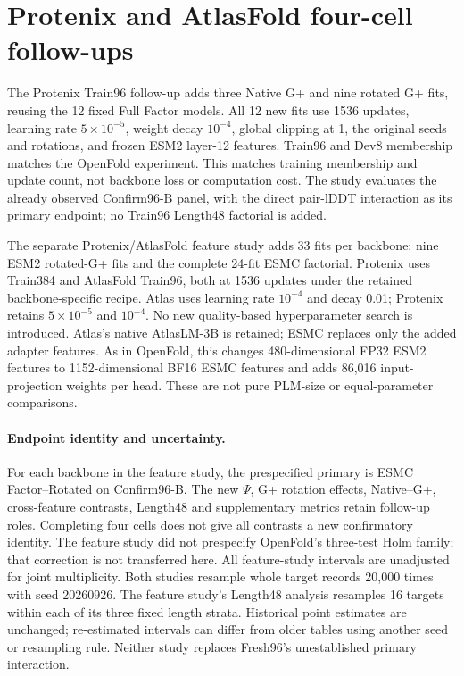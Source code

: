 \section{Protenix and AtlasFold four-cell follow-ups}
\label{app:dh_fourcells}
The Protenix Train96 follow-up adds three Native G+ and nine rotated G+ fits,
reusing the 12 fixed Full Factor models. All 12 new fits use 1536 updates,
learning rate $5\times10^{-5}$, weight decay $10^{-4}$, global clipping at 1,
the original seeds and rotations, and frozen ESM2 layer-12 features.
Train96 and Dev8 membership matches the OpenFold experiment. This matches
training membership and update count, not backbone loss or computation cost.
The study evaluates the already observed Confirm96-B panel, with the direct
pair-lDDT interaction as its primary endpoint; no Train96 Length48 factorial
is added.

The separate Protenix/AtlasFold feature study adds 33 fits per backbone:
nine ESM2 rotated-G+ fits and the complete 24-fit ESMC factorial. Protenix
uses Train384 and AtlasFold Train96, both at 1536 updates under the retained
backbone-specific recipe. Atlas uses learning rate $10^{-4}$ and decay 0.01;
Protenix retains $5\times10^{-5}$ and $10^{-4}$. No new quality-based
hyperparameter search is introduced. Atlas's native AtlasLM-3B is retained;
ESMC replaces only the added adapter features. As in OpenFold, this changes
480-dimensional FP32 ESM2 features to 1152-dimensional BF16 ESMC features and
adds 86,016 input-projection weights per head. These are not pure PLM-size or
equal-parameter comparisons.

\paragraph{Endpoint identity and uncertainty.}
For each backbone in the feature study, the prespecified primary is ESMC Factor--Rotated on
Confirm96-B. The new $\Psi$, G+ rotation effects, Native--G+, cross-feature
contrasts, Length48 and supplementary metrics retain follow-up roles.
Completing four cells does not give all contrasts a new confirmatory identity.
The feature study did not prespecify OpenFold's three-test Holm family; that correction is
not transferred here. All feature-study intervals are unadjusted for joint
multiplicity. Both studies resample whole target records 20,000 times with
seed 20260926. The feature study's Length48 analysis resamples 16 targets within each of its three fixed
length strata. Historical point estimates are unchanged; re-estimated
intervals can differ from older tables using another seed or resampling rule.
Neither study replaces Fresh96's unestablished primary interaction.

